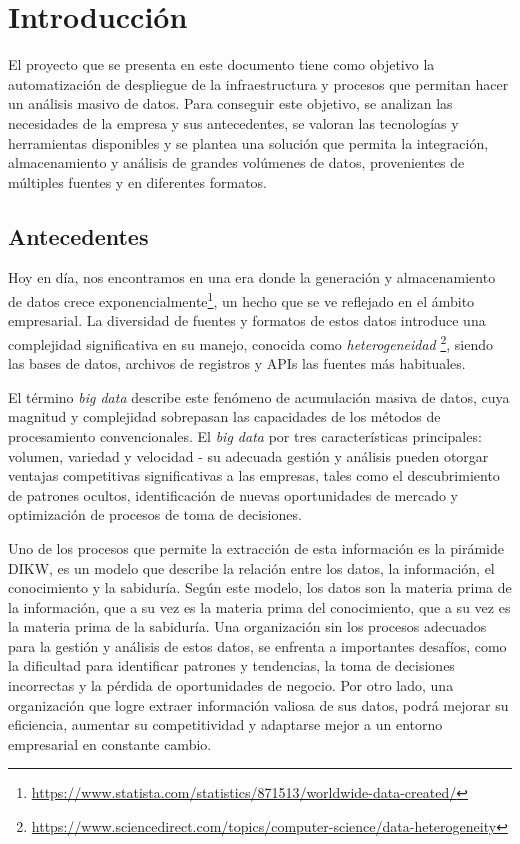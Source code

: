 \chapter{Introducción}\label{chap:intro}
El proyecto que se presenta en este documento tiene como objetivo la automatización de despliegue de la
infraestructura y procesos que permitan hacer un análisis masivo de datos. Para conseguir este objetivo,
se analizan las necesidades de la empresa y sus antecedentes, se valoran las tecnologías y herramientas
disponibles y se plantea una solución que permita la integración, almacenamiento y análisis de grandes
volúmenes de datos, provenientes de múltiples fuentes y en diferentes formatos.

\section{Antecedentes}\label{sec:antecedentes}
Hoy en día, nos encontramos en una era donde la generación y almacenamiento de datos crece
exponencialmente\footnote{\url{https://www.statista.com/statistics/871513/worldwide-data-created/}},
un hecho que se ve reflejado en el ámbito empresarial. La diversidad de fuentes y formatos de
estos datos introduce una complejidad significativa en su manejo, conocida como \textit{heterogeneidad}
\footnote{\url{https://www.sciencedirect.com/topics/computer-science/data-heterogeneity}}, siendo las
bases de datos, archivos de registros y APIs las fuentes más habituales.

El término \textit{big data} describe este fenómeno de acumulación masiva de datos, cuya magnitud y
complejidad sobrepasan las capacidades de los métodos de procesamiento convencionales. El \textit{big data}
por tres características principales: volumen, variedad y velocidad - su adecuada gestión y análisis
pueden otorgar ventajas competitivas significativas a las empresas, tales como el descubrimiento de
patrones ocultos, identificación de nuevas oportunidades de mercado y optimización de procesos de toma
de decisiones.

Uno de los procesos que permite la extracción de esta información es la pirámide DIKW, \cite{enwiki:1211227190}
es un modelo que describe la relación entre los datos, la información, el conocimiento y la sabiduría.
Según este modelo, los datos son la materia prima de la información, que a su vez es la materia prima
del conocimiento, que a su vez es la materia prima de la sabiduría. Una organización sin los procesos
adecuados para la gestión y análisis de estos datos, se enfrenta a importantes desafíos, como la dificultad
para identificar patrones y tendencias, la toma de decisiones incorrectas y la pérdida de oportunidades de
negocio. Por otro lado, una organización que logre extraer información valiosa de sus datos, podrá mejorar su
eficiencia, aumentar su competitividad y adaptarse mejor a un entorno empresarial en constante cambio.


